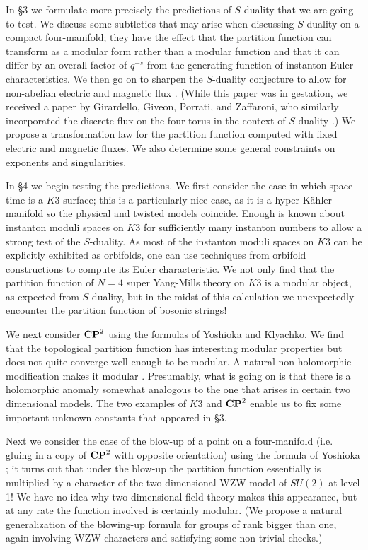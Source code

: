 \documentclass[12pt]{article}
\numberwithin{equation}{section}
\begin{document}
In \S3 we formulate more precisely the predictions of $S$-duality
that we are going to test.
We discuss some subtleties that may arise when discussing $S$-duality
on a compact four-manifold;
they have the effect that the partition function can transform as a modular
form rather than a modular function and that it can differ
by an overall factor of $q^{-s}$ from the generating function
of instanton Euler characteristics.
We then go on to sharpen the $S$-duality conjecture to
allow for non-abelian electric and magnetic flux \cite{thooft}.
(While this paper was in gestation, we received
  a paper by Girardello, Giveon, Porrati, and Zaffaroni, who similarly
  incorporated the discrete flux on the four-torus in the context
of $S$-duality \cite{giv}.)
We propose a transformation law for the partition function computed
with fixed electric and magnetic fluxes.
We also determine some general constraints on exponents and singularities.

In \S4 we begin testing the predictions.
We first consider the case in which space-time is a $K3$  surface;
this is a particularly nice case, as it is a hyper-K\"ahler manifold so the
physical and twisted models coincide. Enough is known
about instanton moduli spaces on $K3$
for sufficiently many instanton numbers
to allow a strong test of the $S$-duality.
As most of the instanton moduli spaces on $K3$ can be explicitly
exhibited as orbifolds, one can
use techniques from orbifold
constructions to compute its Euler characteristic.
We not only find that the partition function of $N=4$ super Yang-Mills
theory on $K3$ is a modular object, as expected from $S$-duality, but
in the midst of this calculation we unexpectedly
encounter the partition function
of bosonic strings!

We next consider ${\bf CP}^2$ using the formulas of Yoshioka and Klyachko.
We find that the topological partition function
has interesting modular properties but
does not quite converge well enough to be modular.
A natural
non-holomorphic modification makes it modular \cite{zag,hirzag}.
Presumably, what is going on is that there is a holomorphic anomaly
somewhat analogous to the one that arises
\cite{bcov} in certain two dimensional models.
The two examples of $K3$ and ${\bf CP}^2$ enable
us to fix some important unknown constants that appeared in \S3.

Next we consider the case of the blow-up of a point on a
four-manifold (i.e. gluing in a copy of ${{\bf CP}^2}$ with opposite
orientation)
using the formula of Yoshioka
\cite{yosh};  it turns out that under the blow-up the partition
function essentially is multiplied
by a character of the two-dimensional WZW model
of $SU(2)$ at level 1!  We have no idea why two-dimensional field theory
makes this appearance, but at any rate the
function involved is certainly modular.
(We propose a natural generalization  of the blowing-up formula
  for groups of rank bigger than one, again involving WZW characters and
satisfying some non-trivial checks.)
\end{document}
